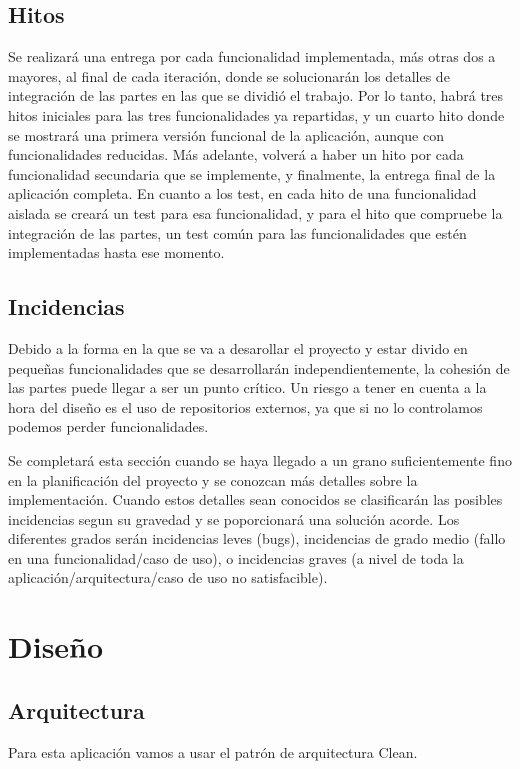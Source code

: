 \documentclass[a4paper,openright,12pt]{article}
\begin{document}
\subsection{Hitos}
Se realizará una entrega por cada funcionalidad implementada, más otras dos a mayores, al final de cada iteración, donde se solucionarán los detalles de integración de las partes en las que se dividió el trabajo. Por lo tanto, habrá tres hitos iniciales para las tres funcionalidades ya repartidas, y un cuarto hito donde se mostrará una primera versión funcional de la aplicación, aunque con funcionalidades reducidas. Más adelante, volverá a haber un hito por cada funcionalidad secundaria que se implemente, y finalmente, la entrega final de la aplicación completa.
En cuanto a los test, en cada hito de una funcionalidad aislada se creará un test para esa funcionalidad, y para el hito que compruebe la integración de las partes, un test común para las funcionalidades que estén implementadas hasta ese momento.
\subsection{Incidencias}
Debido a la forma en la que se va a desarollar el proyecto y estar divido en pequeñas funcionalidades que se desarrollarán independientemente, la cohesión de las partes puede llegar a ser un punto crítico.
Un riesgo a tener en cuenta a la hora del diseño es el uso de repositorios externos, ya que si no lo controlamos podemos perder funcionalidades. \cite{misc-hc}

Se completará esta sección cuando se haya llegado a un grano suficientemente fino en la planificación del proyecto y se conozcan más detalles sobre la implementación.
Cuando estos detalles sean conocidos se clasificarán las posibles incidencias segun su gravedad y se poporcionará una solución acorde. Los diferentes grados serán incidencias leves (bugs), incidencias de grado medio (fallo en una funcionalidad/caso de uso), o incidencias graves (a nivel de toda la aplicación/arquitectura/caso de uso no satisfacible).

\section{Diseño}

\subsection{Arquitectura}
Para esta aplicación vamos a usar el patrón de arquitectura Clean.
\end{document}
